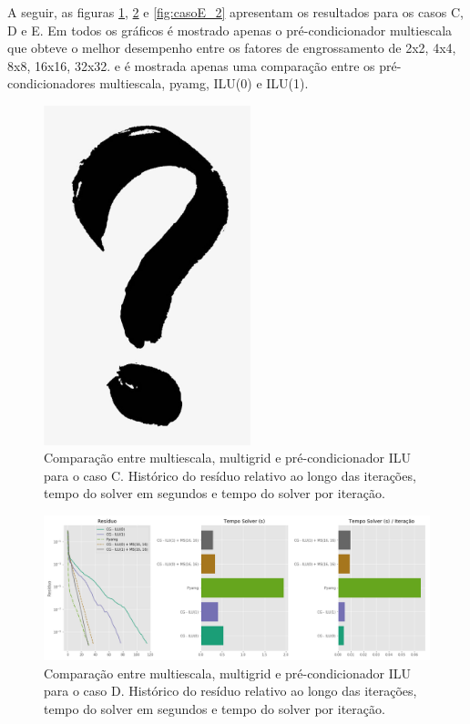A seguir, as figuras \ref{fig:casoC_2}, \ref{fig:casoD_2} e \ref{fig:casoE_2} apresentam os resultados para os casos C, D e E. 
Em todos os gráficos é mostrado apenas o pré-condicionador multiescala que obteve o melhor desempenho entre os fatores de engrossamento de 2x2, 4x4, 8x8, 16x16, 32x32. e é mostrada apenas uma comparação entre os pré-condicionadores multiescala, pyamg, ILU(0) e ILU(1).

\begin{figure}[!htbp]
\centering
\includegraphics[width=6cm]{interrogacao.png}
\caption{Comparação entre multiescala, multigrid e pré-condicionador ILU para o caso C. Histórico do resíduo relativo ao longo das iterações, tempo do solver em segundos e tempo do solver por iteração. }
\label{fig:casoC_2}
\end{figure}

\begin{figure}[!htbp]
\centering
\includegraphics[width=\textwidth]{chap08/figs/casoD_2.png}
\caption{Comparação entre multiescala, multigrid e pré-condicionador ILU para o caso D. Histórico do resíduo relativo ao longo das iterações, tempo do solver em segundos e tempo do solver por iteração. }
\label{fig:casoD_2}
\end{figure}

